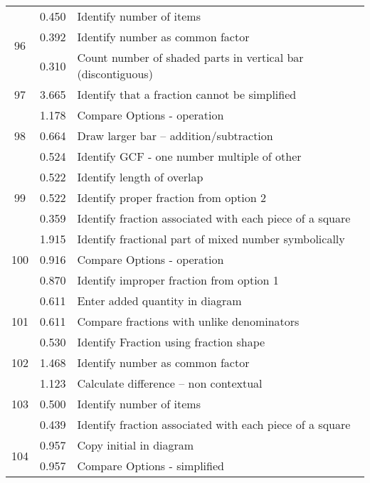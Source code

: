 \begin{longtable}[c]{|c|c|l|}
\hline
\multirow{3}{*}{\small 96} & \small 0.450 & \small Identify number of items \\
 & \small 0.392 & \small Identify number as common factor \\
 & \small 0.310 & \small Count number of shaded parts in vertical bar (discontiguous) \\
\hline
\multirow{1}{*}{\small 97} & \small 3.665 & \small Identify that a fraction cannot be simplified \\
\hline
\multirow{3}{*}{\small 98} & \small 1.178 & \small Compare Options - operation \\
 & \small 0.664 & \small Draw larger bar -- addition/subtraction \\
 & \small 0.524 & \small Identify GCF - one number multiple of other \\
\hline
\multirow{3}{*}{\small 99} & \small 0.522 & \small Identify length of overlap \\
 & \small 0.522 & \small Identify proper fraction from option 2 \\
 & \small 0.359 & \small Identify fraction associated with each piece of a square \\
\hline
\multirow{3}{*}{\small 100} & \small 1.915 & \small Identify fractional part of mixed number symbolically \\
 & \small 0.916 & \small Compare Options - operation \\
 & \small 0.870 & \small Identify improper fraction from option 1 \\
\hline
\multirow{3}{*}{\small 101} & \small 0.611 & \small Enter added quantity in diagram \\
 & \small 0.611 & \small Compare fractions with unlike denominators \\
 & \small 0.530 & \small Identify Fraction using fraction shape \\
\hline
\multirow{1}{*}{\small 102} & \small 1.468 & \small Identify number as common factor \\
\hline
\multirow{3}{*}{\small 103} & \small 1.123 & \small Calculate difference -- non contextual \\
 & \small 0.500 & \small Identify number of items \\
 & \small 0.439 & \small Identify fraction associated with each piece of a square \\
\hline
\multirow{3}{*}{\small 104} & \small 0.957 & \small Copy initial in diagram \\
 & \small 0.957 & \small Compare Options - simplified \\

\end{longtable}
